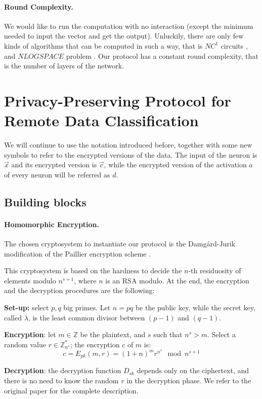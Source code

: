 \documentclass[11pt,oribibl,runningheads]{llncs}
\begin{document}
\paragraph{Round Complexity.} We would like to run the computation with no interaction (except the minimum needed to input the vector and get the output). Unluckily, there are only few kinds of
algorithms that can be computed in such a way, that is $NC^1$
circuits \cite{sander1999nic}, and $NLOGSPACE$ problem
\cite{beaver2000mls}. Our protocol has a constant round
complexity, that is the
number of layers of the network.

\section{Privacy-Preserving Protocol for Remote Data Classification}
\label{sec:protocol}
We will continue to use the notation introduced before, together with some
new symbols to refer to the encrypted versions of the data. The
input of the neuron is $\vec{x}$ and its encrypted version is
$\vec{c}$, while the encrypted version of the activation $a$ of
every neuron will be referred as $d$.

\subsection{Building blocks}
\label{sec.bb}
\paragraph{Homomorphic Encryption.}
The chosen cryptosystem to instantiate our protocol is the
Damg{\aa}rd-Jurik modification \cite{rd-generalisation} of the
Paillier encryption scheme \cite{Pailler99}.

This cryptosystem is based on the hardness to decide the $n$-th
residuosity of elements modulo $n^{s+1}$, where $n$ is an RSA
modulo. At the end, the encryption and the decryption procedures
are the following:

\textbf{Set-up:} select $p,q$ big primes. Let $n=pq$ be the public
key, while the secret key, called $\lambda$, is the least common
divisor between $(p-1)$ and $(q-1)$.

\textbf{Encryption}: let $m \in \mathbb{Z}$ be the plaintext, and
$s$ such that $n^s > m$. Select a random value $r \in
\mathbb{Z}^*_{n^s}$; the encryption $c$ of $m$ is:
$$
c= E_{pk}(m,r) = (1+n)^m r^{n^s} \mod {n^{s+1}}
$$

\textbf{Decryption}: the decryption function $D_{sk}$ depends only
on the ciphertext, and there is no need to know the random $r$ in
the decryption phase. We refer to the original paper for the
complete description.
\end{document}
